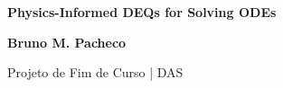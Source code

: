 \documentclass[t]{beamer}
\begin{document}
{
\begin{frame}
\vspace{18mm}
\begin{flushright}
\textcolor{cinza}{\textbf{\Large{
Physics-Informed DEQs for Solving ODEs
}}}
\end{flushright}

\vspace{-6mm}
\begin{flushright}
\textcolor{cinza}{\textbf{\scriptsize{
Bruno M. Pacheco
}}}
\end{flushright}

\vspace{-7mm}
\begin{flushright}
\textcolor{cinza}{\scriptsize{
Projeto de Fim de Curso | DAS
}}
\end{flushright}


\end{frame}
}

\end{document}
